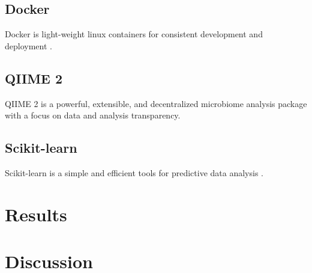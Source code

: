 \documentclass[11pt, a4paper]{article}
\begin{document}
        \subsection{Docker}
            Docker is light-weight linux containers for consistent development and deployment \cite{docker1}.

        \subsection{QIIME 2}
            QIIME 2 is a powerful, extensible, and decentralized microbiome analysis package with a focus on data and analysis transparency.

        \subsection{Scikit-learn}
            Scikit-learn is a simple and efficient tools for predictive data analysis \cite{sklearn1, sklearn2}.

    \section{Results}

    \section{Discussion}

    
    
\end{document}
